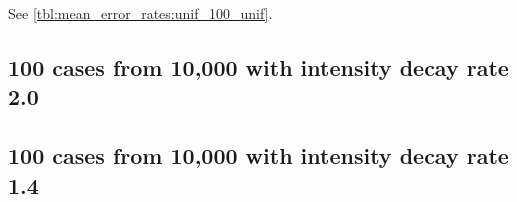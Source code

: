 See \autoref{tbl:mean_error_rates:unif_100_unif}.

\begin{table}[H]
\centering
\scriptsize

    \begin{subtable}{0.5\textwidth}
    
    \caption{Means} 
    \end{subtable}%
    \begin{subtable}{0.5\textwidth}
    
    \caption{Standard deviations} 
    \end{subtable}

\caption{Error rates for uniform population of 10,000, single peak intensity of factor 100 and no decay (uniform)}
\label{tbl:mean_error_rates:unif_100_unif:2}
\end{table}

\subsection{100 cases from 10,000 with intensity decay rate 2.0}
\begin{table}[H]
\centering
\scriptsize

    \begin{subtable}{0.5\textwidth}
    
    \caption{Means} 
    \end{subtable}%
    \begin{subtable}{0.5\textwidth}
    
    \caption{Standard deviations} 
    \end{subtable}

\caption{Error rates for uniform population of 10,000, single peak intensity of factor 100 and decay rate 2.0}
\label{tbl:mean_error_rates:unif_100_2_1h}
\end{table}

\subsection{100 cases from 10,000 with intensity decay rate 1.4}
\begin{table}[H]
\centering
\scriptsize

    \begin{subtable}{0.5\textwidth}
    
    \caption{Means} 
    \end{subtable}%
    \begin{subtable}{0.5\textwidth}
    
    \caption{Standard deviations} 
    \end{subtable}

\caption{Error rates for uniform population of 10,000, single peak intensity of factor 100 and decay rate 1.4}
\label{tbl:mean_error_rates:unif_100_1.4_1h}
\end{table}

